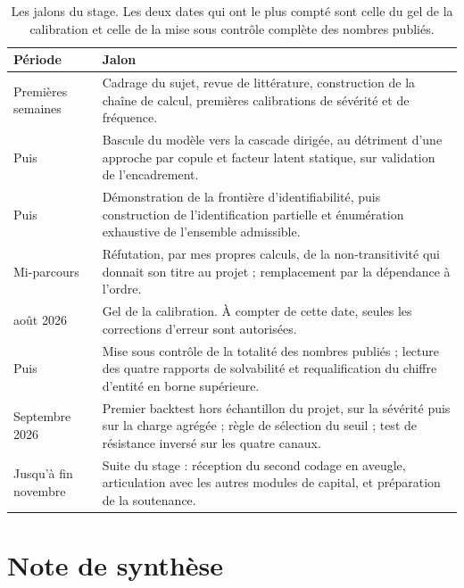 \documentclass[12pt,a4paper]{article}
\theoremstyle{definition}
\begin{document}
\begin{table}[htbp]
\centering\small
\renewcommand{\arraystretch}{1.2}
\begin{tabular}{@{}>{\raggedright\arraybackslash}p{3.2cm}>{\raggedright\arraybackslash}p{10.5cm}@{}}
\toprule
\textbf{Période} & \textbf{Jalon} \\
\midrule
Premières semaines & Cadrage du sujet, revue de littérature, construction de la
chaîne de calcul, premières calibrations de sévérité et de fréquence. \\
Puis & Bascule du modèle vers la cascade dirigée, au détriment d'une approche par
copule et facteur latent statique, sur validation de l'encadrement. \\
Puis & Démonstration de la frontière d'identifiabilité, puis construction de
l'identification partielle et énumération exhaustive de l'ensemble admissible. \\
Mi-parcours & Réfutation, par mes propres calculs, de la non-transitivité qui
donnait son titre au projet ; remplacement par la dépendance à l'ordre. \\
7 août 2026 & Gel de la calibration. À compter de cette date, seules les
corrections d'erreur sont autorisées. \\
Puis & Mise sous contrôle de la totalité des nombres publiés ; lecture des quatre
rapports de solvabilité et requalification du chiffre d'entité en borne
supérieure. \\
Septembre 2026 & Premier backtest hors échantillon du projet, sur la sévérité puis
sur la charge agrégée ; règle de sélection du seuil ; test de résistance inversé
sur les quatre canaux. \\
Jusqu'à fin novembre & Suite du stage : réception du second codage en aveugle,
articulation avec les autres modules de capital, et préparation de la soutenance. \\
\bottomrule
\end{tabular}
\caption{Les jalons du stage. Les deux dates qui ont le plus compté sont celle du
gel de la calibration et celle de la mise sous contrôle complète des nombres
publiés.}
\label{tab:chronologie}
\end{table}

\newpage
\section*{Note de synthèse}
\vspace{-6pt}
\end{document}
